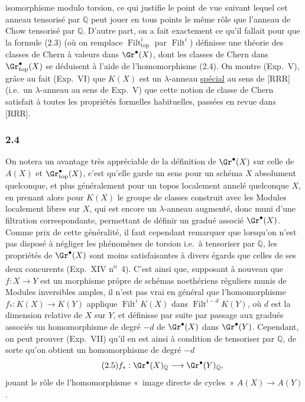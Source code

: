 isomorphisme modulo torsion, ce qui justifie le point de vue suivant lequel cet anneau tensorisé par $\mathbb Q$ peut jouer en tous points le même rôle que l'anneau de Chow tensorisé par $\mathbb Q$. D'autre part, on a fait exactement ce qu'il fallait pour que la formule (2.3) (où on remplace $\operatorname{Filt}^i_{\mathrm{top}}$ par $\operatorname{Filt}^i$) définisse une théorie des classes de Chern à valeurs dans $\Gr^\bullet(X)$, dont les classes de Chern dans $\Gr^{\bullet}_{\mathrm{top}}(X)$ se déduisent à l'aide de l'homomorphisme (2.4). On montre (Exp.\ V), grâce au fait (Exp.\ VI) que $K(X)$ est un $\lambda$-anneau \underline{spécial} au sens de [RRR] (i.e.\ un $\lambda$-anneau au sens de Exp.\ V) que cette notion de classe de Chern satisfait à toutes les propriétés formelles habituelles, passées en revue dans [RRR].

\subsubsection*{2.4}
On notera un avantage très appréciable de la définition de $\Gr^\bullet(X)$ sur celle de $A(X)$ et $\Gr^{\bullet}_{\mathrm{top}}(X)$, c'est qu'elle garde un sens pour un schéma $X$ absolument quelconque, et plus généralement pour un topos localement annelé quelconque $X$, en prenant alors pour $K(X)$ le groupe de classes construit avec les Modules localement libres sur $X$, qui est encore un $\lambda$-anneau augmenté, donc muni d'une filtration correspondante, permettant de définir un gradué associé $\Gr^\bullet(X)$. Comme prix de cette généralité, il faut cependant remarquer que lorsqu'on n'est pas disposé à négliger les phénomènes de torsion i.e.\ à tensoriser par $\mathbb Q$, les propriétés de $\Gr^\bullet(X)$ sont moins satisfaisantes à divers égards que celles de ses deux concurents (Exp.\ XIV n\textsuperscript{o}~4). C'est ainsi que, supposant à nouveau que $f:X\to Y$ est un morphisme própre de schémas noethériens réguliers munis de Modules inversibles amples, il n'est pas vrai en général que l'homomorphisme $f_*:K(X)\longrightarrow K(Y)$ applique $\operatorname{Filt}^i K(X)$ dans $\operatorname{Filt}^{i-d} K(Y)$, où $d$ est la dimension relative de $X$ sur $Y$, et définisse par suite par passage aux gradués associés un homomorphisme de degré $-d$ de $\Gr^\bullet(X)$ dans $\Gr^\bullet(Y)$. Cependant, on peut prouver (Exp.\ VII) qu'il en est ainsi à condition de tensoriser par $\mathbb Q$, de sorte qu'on obtient un homomorphisme de degré $-d$
\begin{equation}\tag{2.5}
f_*:\Gr^\bullet(X)_{\mathbb Q}\longrightarrow \Gr^\bullet(Y)_{\mathbb Q},
\end{equation}
jouant le rôle de l'homomorphisme «~image directe de cycles~» $A(X)\to A(Y)$.

